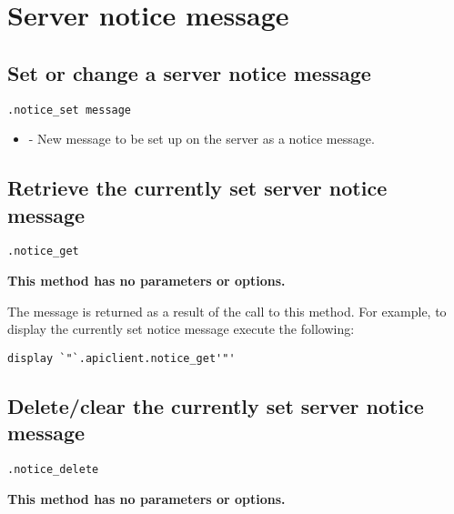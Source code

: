 
\section{Server notice message}


\subsection{Set or change a server notice message}
\begin{lstlisting}[style=CommandLineStyle]
.notice_set message
\end{lstlisting}

\paramsheader
\begin{itemize}
\item {} - New message to be set up on the server as a notice message.
\end{itemize}

\subsection{Retrieve the currently set server notice message}
\begin{lstlisting}[style=CommandLineStyle]
.notice_get
\end{lstlisting}

\textbf{This method has no parameters or options.}

The message is returned as a result of the call to this method. For example, to display the currently set notice message execute the following:

\begin{lstlisting}[style=CommandLineStyle]
display `"`.apiclient.notice_get'"'
\end{lstlisting}

\subsection{Delete/clear the currently set server notice message}
\begin{lstlisting}[style=CommandLineStyle]
.notice_delete
\end{lstlisting}

\textbf{This method has no parameters or options.}


